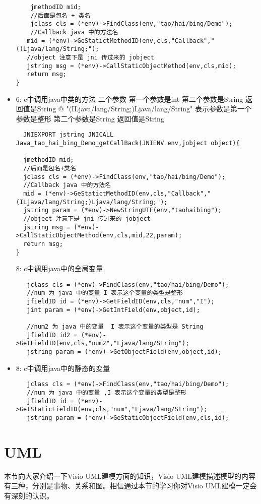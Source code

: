 \documentclass[a4paper,11pt]{book}
\begin{document}
\begin{itemize}
\begin{lstlisting}
    jmethodID mid;
    //后面是包名 + 类名
    jclass cls = (*env)->FindClass(env,"tao/hai/bing/Demo"); 
    //Callback java 中的方法名
   mid = (*env)->GeStatictMethodID(env,cls,"Callback","()Ljava/lang/String;");
   //object 注意下是 jni 传过来的 jobject
   jstring msg = (*env)->CallStaticObjectMethod(env,cls,mid); 
   return msg;
}
\end{lstlisting}

\item 6: c中调用java中类的方法 二个参数 第一个参数是int 第二个参数是String 返回值是String
    @ "(ILjava/lang/String;)Ljava/lang/String" 表示参数是第一个参数是整形 第二个参数是String  返回值是String
\begin{lstlisting}
  JNIEXPORT jstring JNICALL Java_tao_hai_bing_Demo_getCallBack(JNIENV env,jobject object){

  jmethodID mid;
  //后面是包名+类名
  jclass cls = (*env)->FindClass(env,"tao/hai/bing/Demo");
  //Callback java 中的方法名
  mid = (*env)->GeStatictMethodID(env,cls,"Callback","(ILjava/lang/String;)Ljava/lang/String;");
  jstring param = (*env)->NewStringUTF(env,"taohaibing");
  //object 注意下是 jni 传过来的 jobject
  jstring msg = (*env)->CallStaticObjectMethod(env,cls,mid,22,param); 
  return msg;
}
\end{lstlisting}

8: c中调用java中的全局变量   
\begin{lstlisting}
   jclass cls = (*env)->FindClass(env,"tao/hai/bing/Demo");
   //num 为 java 中的变量 I 表示这个变量的类型是整形
   jfieldID id = (*env)->GetFieldID(env,cls,"num","I");
   jint param = (*env)->GetIntField(env,object,id);

   //num2 为 java 中的变量  I 表示这个变量的类型是 String
   jfieldID id2 = (*env)->GetFieldID(env,cls,"num2","Ljava/lang/String");
   jstring param = (*env)->GetObjectField(env,object,id);
\end{lstlisting}

\item 8: c中调用java中的静态的变量
\begin{lstlisting}
   jclass cls = (*env)->FindClass(env,"tao/hai/bing/Demo");
   //num 为 java 中的变量 ,I 表示这个变量的类型是整形
   jfieldID id = (*env)->GetStaticFieldID(env,cls,"num","Ljava/lang/String");
   jstring param = (*env)->GeStaticObjectField(env,cls,id); 
\end{lstlisting}
\end{itemize}

\chapter{UML}
本节向大家介绍一下Visio  UML建模方面的知识，Visio  UML建模描述模型的内容有三种，分别是事物、关系和图。相信通过本节的学习你对Visio  UML建模一定会有深刻的认识。
\end{document}
